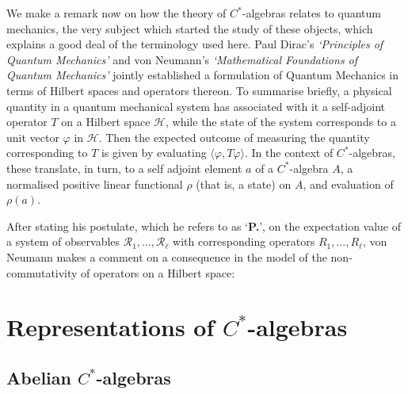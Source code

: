\documentclass[12pt,a4paper]{report}
\theoremstyle{plain}
\theoremstyle{definition}
\newcommand{\1}{\mathbbm{1}}
\renewcommand{\H}{\mathcal{H}}
\renewcommand{\phi}{\varphi}
\begin{document}
We make a remark now on how the theory of $C^\ast$-algebras relates to quantum mechanics, the very 
subject which started the study of these objects, which explains a good deal of the terminology used 
here. Paul Dirac's \emph{`Principles of Quantum Mechanics'} and von Neumann's \emph{`Mathematical 
Foundations of Quantum Mechanics'} jointly established a formulation of Quantum Mechanics in terms of 
Hilbert spaces and operators thereon. To summarise briefly, a physical quantity in a quantum mechanical 
system has associated with it a self-adjoint operator $T$ on a Hilbert space $\H$,  while the state of 
the system corresponds to a unit vector $\phi$ in $\H$. Then the expected outcome of measuring the 
quantity corresponding to $T$ is given by evaluating $\langle\phi, T\phi\rangle$. In the context of $C^
\ast$-algebras, these translate, in turn, to a self adjoint element $a$ of a $C^\ast$-algebra $A$, a 
normalised positive linear functional $\rho$ (that is, a state) on $A$, and evaluation of $\rho(a)$.

After stating his postulate, which he refers to as `\textbf{P.}', on the expectation value of a system 
of observables $\mathscr{R_1},\dots,\mathscr{R_\ell}$ with corresponding operators $R_1,\dots, R_\ell$, 
von Neumann makes a comment on a consequence in the model of the non-commutativity of operators on a 
Hilbert space:




\chapter{Representations of $C^\ast$-algebras}
\section{Abelian $C^\ast$-algebras}\label{section:abelian}

\end{document}
